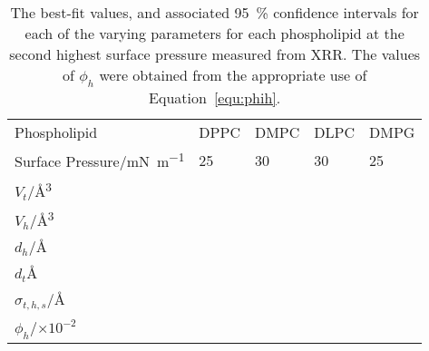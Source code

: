 %
%
\begin{table}
    \centering
    \small
    \caption{The best-fit values, and associated \SI{95}{\percent} confidence intervals for each of the varying parameters for each phospholipid at the second highest surface pressure measured from XRR. The values of $\phi_h$ were obtained from the appropriate use of Equation~\ref{equ:phih}.}
    \label{tab:xrrref3}
    \begin{tabular}{l | l l l l}
        \toprule
        Phospholipid & DPPC & DMPC & DLPC & DMPG \\
        Surface Pressure/\si{\milli\newton\per\meter} & 25 & 30 & 30 & 25 \\
        \midrule
        $V_t$/\si{\angstrom\cubed} &  &  &  &  \\
        $V_h$/\si{\angstrom\cubed} &  &  &  &  \\
        $d_h$/\si{\angstrom} &  &  &  &  \\
        \midrule
        $d_t$\si{\angstrom} &  &  &  &  \\
        $\sigma_{t,h,s}$/\si{\angstrom} &  &  &  &  \\
        \midrule
        $\phi_h$/$\times 10^{-2}$ &  &  &  &  \\
        \bottomrule
    \end{tabular}
\end{table}
